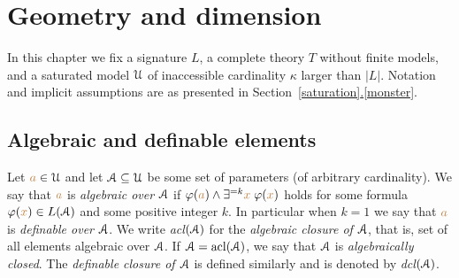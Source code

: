 \chapter{Geometry and dimension}\label{geometria}



\def\medrel#1{\parbox[t]{5ex}{$\displaystyle\hfil #1$}}
\def\ceq#1#2#3{\parbox{35ex}{$\displaystyle #1$}\medrel{#2}$\displaystyle  #3$}

In this chapter we fix a signature $L$, a complete theory $T$ without finite models, and a saturated model $\EuScript U$ of inaccessible cardinality $\kappa$ larger than $|L|$. Notation and implicit assumptions are as presented in Section~\hyperref[saturation]{\ref*{saturation}.\ref*{monster}}.


\section{Algebraic and definable elements}\label{acl}

Let ${\color{brown} a}\in\EuScript U$ and let $\EuScript A\subseteq\EuScript U$ be some set of parameters (of arbitrary cardinality). We say that ${\color{brown} a}$ is \emph{algebraic over $\EuScript A$\/} if $\varphi({\color{brown} a})\wedge\exists^{=k}{\color{brown} x}\;\varphi({\color{brown} x})$ holds for some  formula $\varphi({\color{brown} x})\in L(\EuScript A)$ and  some positive integer $k$. In particular when $k=1$ we say that ${\color{brown} a}$ is \emph{definable over $\EuScript A$}. We write \emph{acl$(\EuScript A)$} for the \emph{algebraic closure of $\EuScript A$}, that is, set of all elements algebraic over $\EuScript A$. If $\EuScript A=\mathop{\rm acl}(\EuScript A)$, we say that $\EuScript A$ is \emph{algebraically closed}. The \emph{definable closure of $\EuScript A$\/} is defined similarly and is denoted by \emph{dcl$(\EuScript A)$}. 

